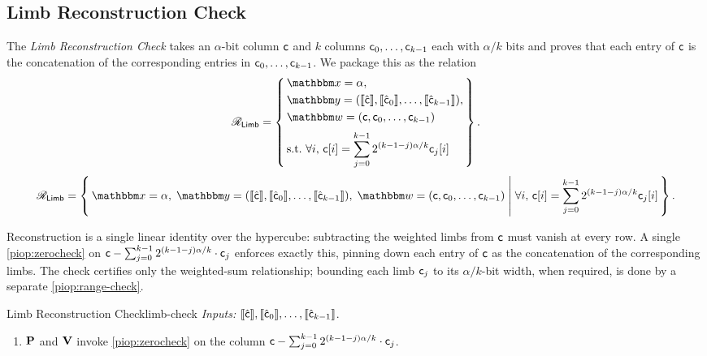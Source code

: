 \subsection{Limb Reconstruction Check}
The \emph{Limb Reconstruction Check} takes an $\alpha$-bit column $\mathsf{c}$ and $k$ columns $\mathsf{c}_0,\dots,\mathsf{c}_{k-1}$ each with $\alpha/k$ bits and proves that each entry of $\mathsf{c}$ is the concatenation of the corresponding entries in $\mathsf{c}_0,\dots,\mathsf{c}_{k-1}$. We package this as the relation
\ifsp
\begin{displaymath}
\NPRelation_{\mathsf{Limb}} = \left\{\,
  \begin{aligned}
    & \NPInstance = \alpha,\\
    & \NPInstancey = (\Oracle{\hat{\col}}, \Oracle{\hat{\col}_0}, \dots, \Oracle{\hat{\col}_{k-1}}),\\
    & \NPWitness = (\col, \col_0, \dots, \col_{k-1})\\[2pt]
    & \text{s.t.}\ \forall i,\, \col[i] = \sum_{j=0}^{k-1} 2^{(k-1-j)\alpha/k} \col_j[i]
  \end{aligned}
\,\right\}.
\end{displaymath}
\else
\begin{displaymath}
\NPRelation_{\mathsf{Limb}} = \left\{\,
  \NPInstance = \alpha,\;
  \NPInstancey = (\Oracle{\hat{\col}}, \Oracle{\hat{\col}_0}, \dots, \Oracle{\hat{\col}_{k-1}}),\;
  \NPWitness = (\col, \col_0, \dots, \col_{k-1})
  \;\middle|\;
    \forall i,\, \col[i] = \sum_{j=0}^{k-1} 2^{(k-1-j)\alpha/k} \col_j[i]
\,\right\}.
\end{displaymath}
\fi


Reconstruction is a single linear identity over the hypercube: subtracting the weighted limbs from $\mathsf{c}$ must vanish at every row. A single \cref{piop:zerocheck} on $\mathsf{c} - \sum_{j=0}^{k-1} 2^{(k-1-j)\alpha/k}\cdot\mathsf{c}_j$ enforces exactly this, pinning down each entry of $\mathsf{c}$ as the concatenation of the corresponding limbs. The check certifies only the weighted-sum relationship; bounding each limb $\mathsf{c}_j$ to its $\alpha/k$-bit width, when required, is done by a separate \cref{piop:range-check}.
\begin{DefinePIOP}{Limb Reconstruction Check}{limb-check}
  \emph{Inputs:} $\llbracket\hat{\mathsf{c}}\rrbracket, \llbracket\hat{\mathsf{c}}_0\rrbracket, \ldots, \llbracket\hat{\mathsf{c}}_{k-1}\rrbracket$.
  \begin{enumerate}[nosep]
    \item $\bf{P}$ and $\bf{V}$ invoke \cref{piop:zerocheck} on the column $\mathsf{c} - \sum_{j=0}^{k-1} 2^{(k-1-j)\alpha/k}\cdot\mathsf{c}_j$.
  \end{enumerate}
\end{DefinePIOP}

